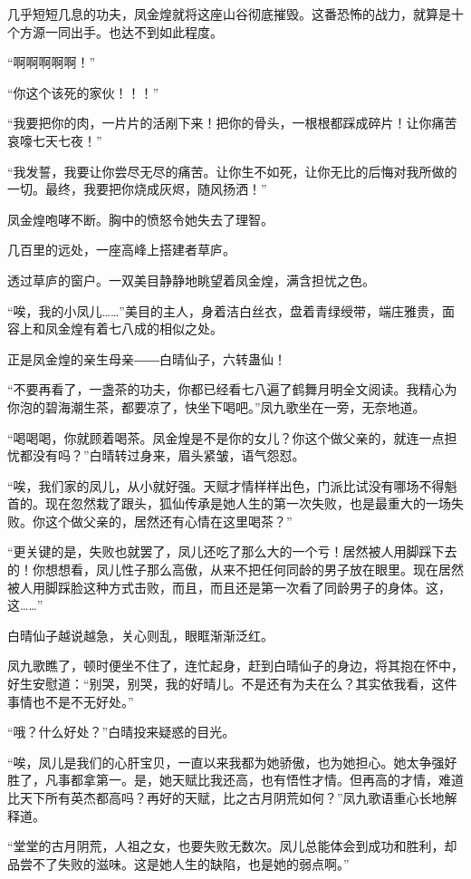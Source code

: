 \begin{this_body}
几乎短短几息的功夫，凤金煌就将这座山谷彻底摧毁。这番恐怖的战力，就算是十个方源一同出手。也达不到如此程度。

“啊啊啊啊啊！”

“你这个该死的家伙！！！”

“我要把你的肉，一片片的活剐下来！把你的骨头，一根根都踩成碎片！让你痛苦哀嚎七天七夜！”

“我发誓，我要让你尝尽无尽的痛苦。让你生不如死，让你无比的后悔对我所做的一切。最终，我要把你烧成灰烬，随风扬洒！”

凤金煌咆哮不断。胸中的愤怒令她失去了理智。

几百里的远处，一座高峰上搭建者草庐。

透过草庐的窗户。一双美目静静地眺望着凤金煌，满含担忧之色。

“唉，我的小凤儿……”美目的主人，身着洁白丝衣，盘着青绿绶带，端庄雅贵，面容上和凤金煌有着七八成的相似之处。

正是凤金煌的亲生母亲――白晴仙子，六转蛊仙！

“不要再看了，一盏茶的功夫，你都已经看七八遍了鹤舞月明全文阅读。我精心为你泡的碧海潮生茶，都要凉了，快坐下喝吧。”凤九歌坐在一旁，无奈地道。

“喝喝喝，你就顾着喝茶。凤金煌是不是你的女儿？你这个做父亲的，就连一点担忧都没有吗？”白晴转过身来，眉头紧皱，语气怨怼。

“唉，我们家的凤儿，从小就好强。天赋才情样样出色，门派比试没有哪场不得魁首的。现在忽然栽了跟头，狐仙传承是她人生的第一次失败，也是最重大的一场失败。你这个做父亲的，居然还有心情在这里喝茶？”

“更关键的是，失败也就罢了，凤儿还吃了那么大的一个亏！居然被人用脚踩下去的！你想想看，凤儿性子那么高傲，从来不把任何同龄的男子放在眼里。现在居然被人用脚踩脸这种方式击败，而且，而且还是第一次看了同龄男子的身体。这，这……”

白晴仙子越说越急，关心则乱，眼眶渐渐泛红。

凤九歌瞧了，顿时便坐不住了，连忙起身，赶到白晴仙子的身边，将其抱在怀中，好生安慰道：“别哭，别哭，我的好晴儿。不是还有为夫在么？其实依我看，这件事情也不是不无好处。”

“哦？什么好处？”白晴投来疑惑的目光。

“唉，凤儿是我们的心肝宝贝，一直以来我都为她骄傲，也为她担心。她太争强好胜了，凡事都拿第一。是，她天赋比我还高，也有悟性才情。但再高的才情，难道比天下所有英杰都高吗？再好的天赋，比之古月阴荒如何？”凤九歌语重心长地解释道。

“堂堂的古月阴荒，人祖之女，也要失败无数次。凤儿总能体会到成功和胜利，却品尝不了失败的滋味。这是她人生的缺陷，也是她的弱点啊。”


\end{this_body}
